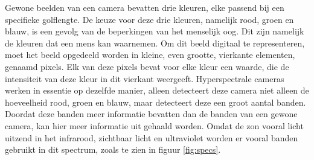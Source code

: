 \documentclass[12pt]{report}
\begin{document}
Gewone beelden van een camera bevatten drie kleuren, elke passend bij een specifieke golflengte. De keuze voor deze drie kleuren, namelijk rood, groen en blauw, is een gevolg van de beperkingen van het menselijk oog. Dit zijn namelijk de kleuren dat een mens kan waarnemen. Om dit beeld digitaal te representeren, moet het beeld opgedeeld worden in kleine, even grootte, vierkante elementen, genaamd pixels. Elk van deze pixels bevat voor elke kleur een waarde, die de intensiteit van deze kleur in dit vierkant weergeeft. Hyperspectrale cameras werken in essentie op dezelfde manier, alleen detecteert deze camera niet alleen de hoeveelheid rood, groen en blauw, maar detecteert deze een groot aantal banden. Doordat deze banden meer informatie bevatten dan de banden van een gewone camera, kan hier meer informatie uit gehaald worden. Omdat de zon vooral licht uitzend in het infrarood, zichtbaar licht en ultraviolet worden er vooral banden gebruikt in dit spectrum, zoals te zien in figuur \ref{fig:specs}.  
\end{document}
